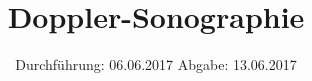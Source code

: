 

\subject{US3}
\title{Doppler-Sonographie}
\date{
\centering
  Durchführung: 06.06.2017
  \hspace{3em}
  Abgabe: 13.06.2017
}



\maketitle
\thispagestyle{empty}
\tableofcontents
\newpage



\FloatBarrier
%




\printbibliography


